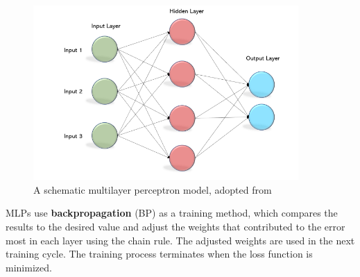 \documentclass[nobib]{tufte-handout}
\begin{document}
\begin{figure}[h!]
\centering
  \includegraphics[width=0.9\textwidth]{mlp3.png}
  \caption{A schematic multilayer perceptron model, adopted from \cite{becominghuman:MLP}}
  \label{fig:mlp}
\end{figure}
\newpage
MLPs use \textbf{backpropagation} (BP) as a training method, which compares the results to the desired value and adjust the weights that contributed to the error most in each layer using the chain rule. The adjusted weights are used in the next training cycle. The training process terminates when the loss function is minimized.
\end{document}
